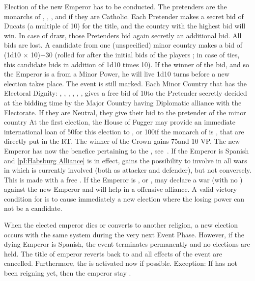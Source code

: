\phevnt
\aparag Election of the new Emperor has to be conducted. The pretenders are
the monarchs of \SPA, \FRA, \ENG, and \POL if they are Catholic.  Each
Pretender makes a secret bid of Ducats (a multiple of 10\ducats) for the
title, and the country with the highest bid will win. In case of draw, those
Pretenders bid again secretly an additional bid. All bids are lost.
\aparag A candidate from one (unspecified) minor country makes a bid of (1d10
$\times$ 10)+30 \ducats (rolled for after the initial bids of the players ; in
case of ties, this candidate bids in addition of 1d10 times 10\ducats). If the
winner of the bid, and so the Emperor is a from a Minor Power, he will live
1d10 turns before a new election takes place. The event is still marked.
\aparag Each Minor Country that has the Electoral Dignity: \paysCologne,
\paysPalatinat, \paysSaxe, \paysTreves, \paysMayence, \paysBrandebourg,
\paysBoheme gives a free bid of 10\ducats to the Pretender secretly decided at
the bidding time by the Major Country having Diplomatic alliance with the
Electorate. If they are Neutral, they give their bid to the pretender of the
minor country
\aparag At the first election, the House of Fugger may provide an immediate
international loan of 50\ducats for this election
to \SPA, or 100\ducats if the monarch of \SPA is , that
are directly put in the RT.
\aparag The winner of the Crown gains 75\ducats and 10 VP.
\aparag The new Emperor has now the benefice pertaining to the \HRE,
see~.
\aparag If the Emperor is Spanish and \ref{pI:Habsburg Alliance} is in effect,
\SPA gains the possibility to involve \HAB in all wars in which \SPA is
currently involved (both as attacker and defender), but not conversely. This
is made with a free \CB.
\aparag If the Emperor is \FRA, \ENG or \POL, \SPA may declare a war (with no
\CB) against the new Emperor and \AUSaus will help in a offensive alliance. A
valid victory condition for \SPA is to cause immediately a new election where
the losing power can not be a candidate.

\effetlong
\aparag When the elected emperor dies or converts to another religion, a new
election occurs with the same system during the very next Event Phase.
\aparag However, if the dying Emperor is Spanish, the event terminates
permanently and no elections are held. The title of emperor reverts back to
\AUSaus and all effects of the event are cancelled. Furthermore, the
 is activated now if possible.
\bparag Exception: If  has not been reigning yet, then the
emperor stay \HIS.



